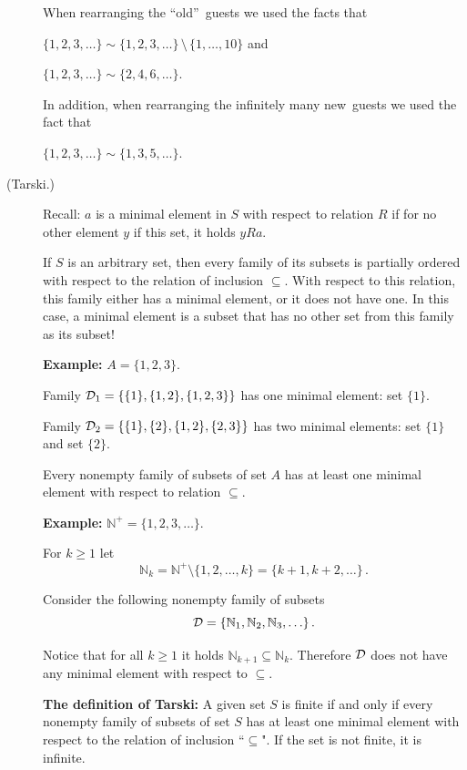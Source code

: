 \documentclass[11pt,paper=b5,footinclude,headinclude]{scrbook} %
\def\brez {{\,\setminus\,}}
\theoremstyle{remark}
\theoremstyle{definition} %
\theoremstyle{theorem} %
\begin{document}
\begin{description}
  When rearranging the ``old''~guests we used the facts that

  $\{1,2,3,\ldots\}\sim\{1,2,3,\ldots\}\brez\{1,\ldots,10\}$ and

  $\{1,2,3,\ldots\}\sim\{2,4,6,\ldots\}$.

  In addition, when rearranging the infinitely many new~guests we used the fact that

  $\{1,2,3,\ldots\}\sim \{1,3,5,\ldots\}$.
  \item[(Tarski.)] Recall: $a$ is a minimal element in $S$ with respect to relation $R$ if for no other element $y$ if this set, it holds $yRa$.

      If $S$ is an arbitrary set, then every family of its subsets is partially ordered with respect to the relation of inclusion $\subseteq$.
      With respect to this relation, this family either has a minimal element, or it does not have one. In this case, a minimal element is a subset that has no other set from this family as its subset!

      \textbf{ Example:} $A = \{1,2,3\}$.

      Family ${\cal D}_1 = \{\{1\}, \{1,2\}, \{1,2,3\}\}$ has one minimal element: set  $\{1\}$.

      Family ${\cal D}_2 = \{\{1\}, \{2\}, \{1,2\}, \{2,3\}\}$ has two minimal elements: set $\{1\}$ and set $\{2\}$.

      Every nonempty family of subsets of set $A$ has at least one minimal element with respect to relation $\subseteq$.

      \textbf{ Example:} $\mathbb{N}^+ = \{1,2,3,\ldots\}$.

      For  $k\ge 1$ let $$\mathbb{N}_k = \mathbb{N}^+\setminus\{1,2,\ldots, k\}= \{k+1,k+2,\ldots\}\,.$$

      Consider the following nonempty family of subsets
      $${\cal D} = \{\mathbb{N}_1,\mathbb{N}_2, \mathbb{N}_3,\ldots\}\,.$$

      Notice that for all $k\ge 1$ it holds $\mathbb{N}_{k+1}\subseteq \mathbb{N}_k$.
      Therefore ${\cal D}$ does not have any minimal element with respect to $\subseteq$.

      \medskip
      \textbf{ The definition of Tarski:}
      A given set $S$ is finite if and only if every nonempty family of subsets of set $S$ has at least one minimal element with respect to the relation of inclusion ``$\subseteq$". If the set is not finite, it is infinite.
\end{description}
\end{document}
